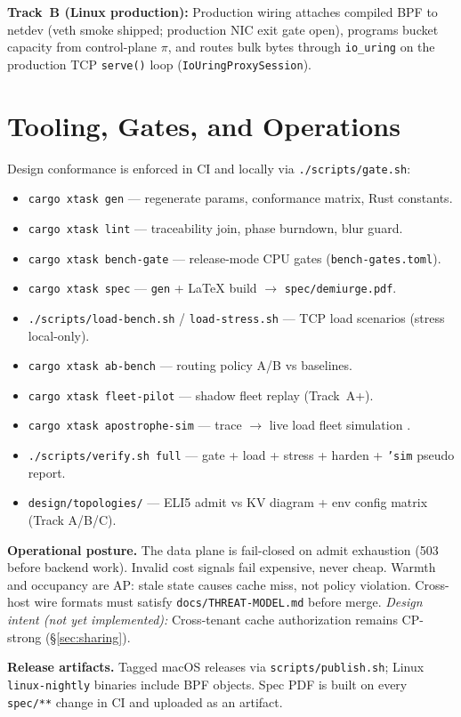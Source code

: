\documentclass[11pt]{article}
\newcommand{\intent}[1]{\textit{Design intent (not yet implemented):} #1}
\newcommand{\trackb}[1]{\textbf{Track~B (Linux production):} #1}
\begin{document}
\trackb{Production wiring attaches compiled BPF to netdev (veth smoke shipped;
production NIC exit gate open), programs bucket capacity from control-plane $\pi$,
and routes bulk bytes through \texttt{io\_uring} on the production TCP
\texttt{serve()} loop (\texttt{IoUringProxySession}).}

\section{Tooling, Gates, and Operations}\label{sec:ops}
Design conformance is enforced in CI and locally via \texttt{./scripts/gate.sh}:
\begin{itemize}[nosep]
  \item \texttt{cargo xtask gen} --- regenerate params, conformance matrix, Rust constants.
  \item \texttt{cargo xtask lint} --- traceability join, phase burndown, blur guard.
  \item \texttt{cargo xtask bench-gate} --- release-mode CPU gates (\texttt{bench-gates.toml}).
  \item \texttt{cargo xtask spec} --- \texttt{gen} + \LaTeX{} build $\to$ \texttt{spec/demiurge.pdf}.
  \item \texttt{./scripts/load-bench.sh} / \texttt{load-stress.sh} --- TCP load scenarios (stress local-only).
  \item \texttt{cargo xtask ab-bench} --- routing policy A/B vs baselines.
  \item \texttt{cargo xtask fleet-pilot} --- shadow fleet replay (Track~A+).
  \item \texttt{cargo xtask apostrophe-sim} --- trace $\to$ live load fleet simulation .
  \item \texttt{./scripts/verify.sh full} --- gate + load + stress + harden + \texttt{'sim} pseudo report.
  \item \texttt{design/topologies/} --- ELI5 admit vs KV diagram + env config matrix (Track A/B/C).
\end{itemize}

\textbf{Operational posture.} The data plane is fail-closed on admit exhaustion
(503 before backend work). Invalid cost signals fail expensive, never cheap.
Warmth and occupancy are AP: stale state causes cache miss, not policy violation.
Cross-host wire formats must satisfy \texttt{docs/THREAT-MODEL.md} before merge.
\intent{Cross-tenant cache authorization remains CP-strong (\S\ref{sec:sharing}).}

\textbf{Release artifacts.} Tagged macOS releases via \texttt{scripts/publish.sh};
Linux \texttt{linux-nightly} binaries include BPF objects. Spec PDF is built on
every \texttt{spec/**} change in CI and uploaded as an artifact.
\end{document}
